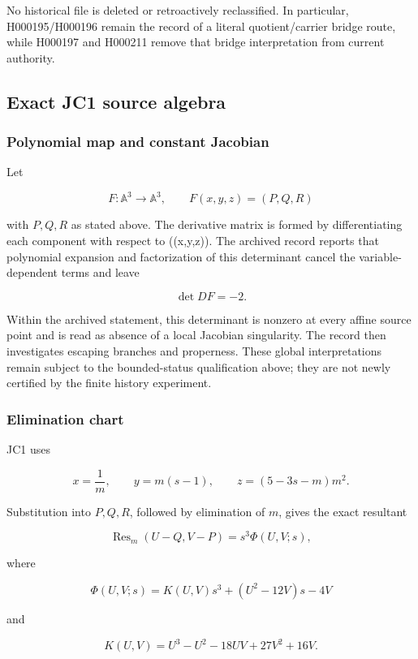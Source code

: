 No historical file is deleted or retroactively reclassified. In
particular, H000195/H000196 remain the record of a literal
quotient/carrier bridge route, while H000197 and H000211 remove that
bridge interpretation from current authority.

\subsection{Exact JC1 source algebra}\label{viii-ch11-exact-jc1-source-algebra}

\subsubsection{Polynomial map and constant
Jacobian}\label{viii-ch11-polynomial-map-and-constant-jacobian}

Let

\[
F:\mathbb A^3\to\mathbb A^3,
\qquad
F(x,y,z)=(P,Q,R)
\]

with \(P,Q,R\) as stated above. The derivative matrix is formed by
differentiating each component with respect to ((x,y,z)). The archived
record reports that polynomial expansion and factorization of this
determinant cancel the variable-dependent terms and leave

\[
\det DF=-2.
\]

Within the archived statement, this determinant is nonzero at every
affine source point and is read as absence of a local Jacobian
singularity. The record then investigates escaping branches and
properness. These global interpretations remain subject to the
bounded-status qualification above; they are not newly certified by the
finite history experiment.

\subsubsection{Elimination chart}\label{viii-ch11-elimination-chart}

JC1 uses

\[
x=\frac1m,
\qquad
y=m(s-1),
\qquad
z=(5-3s-m)m^2.
\]

Substitution into \(P,Q,R\), followed by elimination of \(m\), gives the
exact resultant

\[
\operatorname{Res}_m(U-Q,V-P)
=s^3\Phi(U,V;s),
\]

where

\[
\Phi(U,V;s)=K(U,V)s^3+(U^2-12V)s-4V
\]

and

\[
K(U,V)=U^3-U^2-18UV+27V^2+16V.
\]

